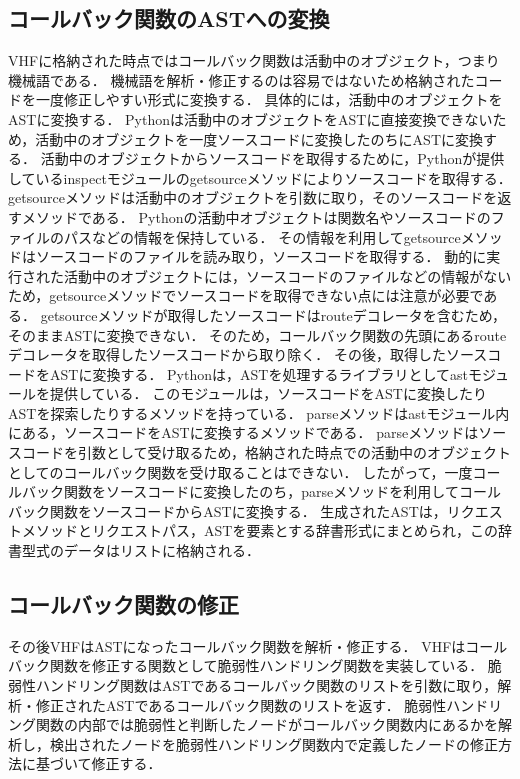 \documentclass[a4paper,12pt]{jreport}
\begin{document}
\subsection{コールバック関数のASTへの変換}
VHFに格納された時点ではコールバック関数は活動中のオブジェクト，つまり機械語である．
機械語を解析・修正するのは容易ではないため格納されたコードを一度修正しやすい形式に変換する．
具体的には，活動中のオブジェクトをASTに変換する．
Pythonは活動中のオブジェクトをASTに直接変換できないため，活動中のオブジェクトを一度ソースコードに変換したのちにASTに変換する．
活動中のオブジェクトからソースコードを取得するために，Pythonが提供しているinspectモジュールのgetsourceメソッドによりソースコードを取得する．
getsourceメソッドは活動中のオブジェクトを引数に取り，そのソースコードを返すメソッドである．
Pythonの活動中オブジェクトは関数名やソースコードのファイルのパスなどの情報を保持している．
その情報を利用してgetsourceメソッドはソースコードのファイルを読み取り，ソースコードを取得する．
動的に実行された活動中のオブジェクトには，ソースコードのファイルなどの情報がないため，getsourceメソッドでソースコードを取得できない点には注意が必要である．
getsourceメソッドが取得したソースコードはrouteデコレータを含むため，そのままASTに変換できない．
そのため，コールバック関数の先頭にあるrouteデコレータを取得したソースコードから取り除く．
その後，取得したソースコードをASTに変換する．
Pythonは，ASTを処理するライブラリとしてastモジュールを提供している．
このモジュールは，ソースコードをASTに変換したりASTを探索したりするメソッドを持っている．
parseメソッドはastモジュール内にある，ソースコードをASTに変換するメソッドである．
parseメソッドはソースコードを引数として受け取るため，格納された時点での活動中のオブジェクトとしてのコールバック関数を受け取ることはできない．
したがって，一度コールバック関数をソースコードに変換したのち，parseメソッドを利用してコールバック関数をソースコードからASTに変換する．
生成されたASTは，リクエストメソッドとリクエストパス，ASTを要素とする辞書形式にまとめられ，この辞書型式のデータはリストに格納される．

\subsection{コールバック関数の修正}
その後VHFはASTになったコールバック関数を解析・修正する．
VHFはコールバック関数を修正する関数として脆弱性ハンドリング関数を実装している．
脆弱性ハンドリング関数はASTであるコールバック関数のリストを引数に取り，解析・修正されたASTであるコールバック関数のリストを返す．
脆弱性ハンドリング関数の内部では脆弱性と判断したノードがコールバック関数内にあるかを解析し，検出されたノードを脆弱性ハンドリング関数内で定義したノードの修正方法に基づいて修正する．
\end{document}

